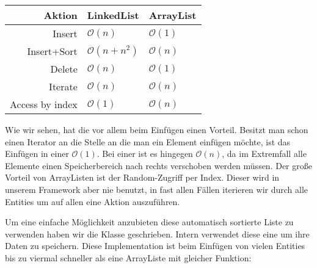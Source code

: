 \begin{table}[h]
\begin{tabular}{|r|l|l|}
\hline
Aktion          & LinkedList             & ArrayList        \\ \hline
Insert          & $ \mathcal O(n)       $ & $ \mathcal O(1) $ \\ \hline
Insert+Sort     & $ \mathcal O(n + n^2) $ & $ \mathcal O(n) $ \\ \hline
Delete          & $ \mathcal O(n)       $ & $ \mathcal O(1) $ \\ \hline
Iterate         & $ \mathcal O(n)       $ & $ \mathcal O(n) $ \\ \hline
Access by index & $ \mathcal O(1)       $ & $ \mathcal O(n) $ \\ \hline
\end{tabular}
\end{table} %

Wie wir sehen, hat die  vor allem beim Einfügen  einen Vorteil. Besitzt man schon einen Iterator an die Stelle an die man ein Element einfügen möchte, ist das Einfügen in einer  $\mathcal O(1)$. Bei einer  ist es hingegen $\mathcal O(n)$, da im Extremfall alle Elemente einen Speicherbereich nach rechts verschoben werden müssen.
Der große Vorteil von ArrayListen ist der Random-Zugriff per Index. Dieser wird in unserem Framework aber nie benutzt, in fast allen Fällen iterieren wir durch alle Entities um auf allen eine Aktion auszuführen.

Um eine einfache Möglichkeit anzubieten diese automatisch sortierte Liste zu verwenden haben wir die Klasse  geschrieben. Intern verwendet diese eine  um ihre Daten zu speichern. Diese Implementation ist beim Einfügen von vielen Entities bis zu viermal schneller als eine ArrayListe mit gleicher Funktion:

